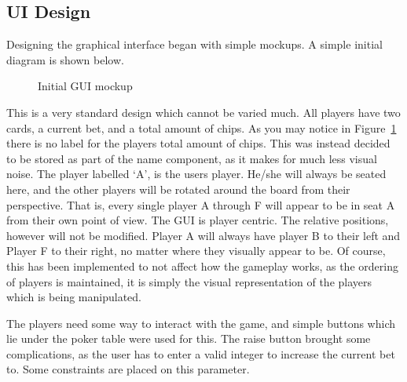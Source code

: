 \newpage{}

\subsection{UI Design}
Designing the graphical interface began with simple mockups. A simple
initial diagram is shown below.

\begin{figure}[h]
    \caption{Initial GUI mockup}%
    \label{fig:initialgui}
\end{figure}

This is a very standard design which cannot be varied much. All players have
two cards, a current bet, and a total amount of chips. As you may notice
in Figure~\ref{fig:initialgui} there is no label for the players total amount
of chips. This was instead decided to be stored as part of the name component,
as it makes for much less visual noise. The player labelled `A', is the
users player. He/she will always be seated here, and the other players will
be rotated around the board from their perspective. That is, every single
player A through F will appear to be in seat A from their own point of view.
The GUI is player centric. The relative positions, however will not be 
modified. Player A will always have player B to their left and Player F to 
their right, no matter where they visually appear to be. Of course, this has 
been implemented to not affect how the gameplay works, as the ordering of 
players is maintained, it is simply the visual representation of the players 
which is being manipulated.

The players need some way to interact with the game, and simple buttons which 
lie under the poker table were used for this. The raise button brought some 
complications, as the user has to enter a valid integer to increase the current
bet to. Some constraints are placed on this parameter.

